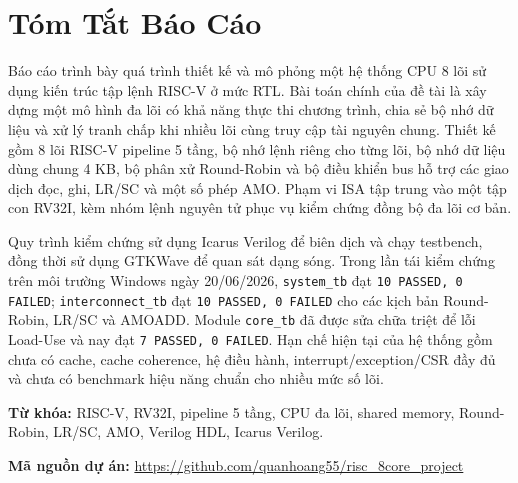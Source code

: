 \documentclass[12pt, a4paper]{report}
\begin{document}
\chapter*{Tóm Tắt Báo Cáo}

Báo cáo trình bày quá trình thiết kế và mô phỏng một hệ thống CPU 8 lõi sử dụng kiến trúc tập lệnh RISC-V ở mức RTL. Bài toán chính của đề tài là xây dựng một mô hình đa lõi có khả năng thực thi chương trình, chia sẻ bộ nhớ dữ liệu và xử lý tranh chấp khi nhiều lõi cùng truy cập tài nguyên chung. Thiết kế gồm 8 lõi RISC-V pipeline 5 tầng, bộ nhớ lệnh riêng cho từng lõi, bộ nhớ dữ liệu dùng chung 4 KB, bộ phân xử Round-Robin và bộ điều khiển bus hỗ trợ các giao dịch đọc, ghi, LR/SC và một số phép AMO. Phạm vi ISA tập trung vào một tập con RV32I, kèm nhóm lệnh nguyên tử phục vụ kiểm chứng đồng bộ đa lõi cơ bản.

Quy trình kiểm chứng sử dụng Icarus Verilog để biên dịch và chạy testbench, đồng thời sử dụng GTKWave để quan sát dạng sóng. Trong lần tái kiểm chứng trên môi trường Windows ngày 20/06/2026, \texttt{system\_tb} đạt \texttt{10 PASSED, 0 FAILED}; \texttt{interconnect\_tb} đạt \texttt{10 PASSED, 0 FAILED} cho các kịch bản Round-Robin, LR/SC và AMOADD. Module \texttt{core\_tb} đã được sửa chữa triệt để lỗi Load-Use và nay đạt \texttt{7 PASSED, 0 FAILED}. Hạn chế hiện tại của hệ thống gồm chưa có cache, cache coherence, hệ điều hành, interrupt/exception/CSR đầy đủ và chưa có benchmark hiệu năng chuẩn cho nhiều mức số lõi.

\textbf{Từ khóa:} RISC-V, RV32I, pipeline 5 tầng, CPU đa lõi, shared memory, Round-Robin, LR/SC, AMO, Verilog HDL, Icarus Verilog.

\vspace{0.5cm}
\noindent\textbf{Mã nguồn dự án:} \url{https://github.com/quanhoang55/risc_8core_project}

\newpage



\newpage

\tableofcontents
\newpage

\listoffigures
{}
\newpage
\end{document}
